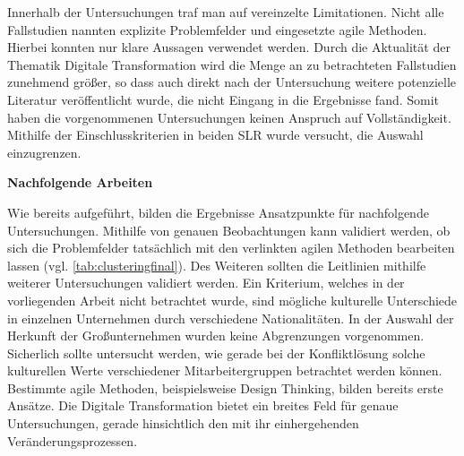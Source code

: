 Innerhalb der Untersuchungen traf man auf vereinzelte Limitationen. Nicht alle Fallstudien nannten explizite Problemfelder und eingesetzte agile Methoden. Hierbei konnten nur klare Aussagen verwendet werden. Durch die Aktualität der Thematik Digitale Transformation wird die Menge an zu betrachteten Fallstudien zunehmend größer, so dass auch direkt nach der Untersuchung weitere potenzielle Literatur veröffentlicht wurde, die nicht Eingang in die Ergebnisse fand. Somit haben die vorgenommenen Untersuchungen keinen Anspruch auf Vollständigkeit. Mithilfe der Einschlusskriterien in beiden SLR wurde versucht,  die Auswahl einzugrenzen.

\clearpage

\textbf{Nachfolgende Arbeiten} 

Wie bereits aufgeführt, bilden die Ergebnisse Ansatzpunkte für nachfolgende Untersuchungen. Mithilfe von genauen Beobachtungen kann validiert werden, ob sich die Problemfelder tatsächlich mit den verlinkten agilen Methoden bearbeiten lassen (vgl. \ref{tab:clusteringfinal}). Des Weiteren sollten die Leitlinien mithilfe weiterer Untersuchungen validiert werden. Ein Kriterium, welches in der vorliegenden Arbeit nicht betrachtet wurde, sind mögliche kulturelle Unterschiede in einzelnen Unternehmen durch verschiedene Nationalitäten. In der Auswahl der Herkunft der Großunternehmen wurden keine Abgrenzungen vorgenommen. Sicherlich sollte untersucht werden, wie gerade bei der Konfliktlösung solche kulturellen Werte verschiedener Mitarbeitergruppen betrachtet werden können. Bestimmte agile Methoden, beispielsweise Design Thinking, bilden bereits erste Ansätze. Die Digitale Transformation bietet ein breites Feld für genaue Untersuchungen, gerade hinsichtlich den mit ihr einhergehenden Veränderungsprozessen.